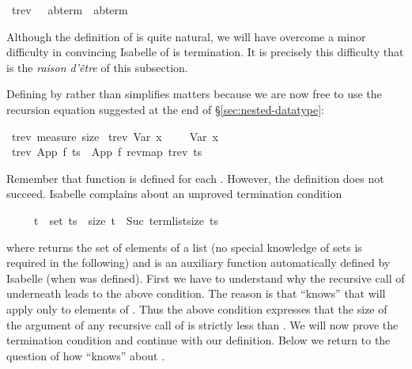 %
\begin{isabellebody}%
\ trev\ \ {\isacharcolon}{\isacharcolon}\ {\isachardoublequote}{\isacharparenleft}{\isacharprime}a{\isacharcomma}{\isacharprime}b{\isacharparenright}term\ {\isasymRightarrow}\ {\isacharparenleft}{\isacharprime}a{\isacharcomma}{\isacharprime}b{\isacharparenright}term{\isachardoublequote}%
\begin{isamarkuptext}%
\noindent
Although the definition of  is quite natural, we will have
overcome a minor difficulty in convincing Isabelle of is termination.
It is precisely this difficulty that is the \textit{raison d'\^etre} of
this subsection.

Defining  by  rather than 
simplifies matters because we are now free to use the recursion equation
suggested at the end of \S\ref{sec:nested-datatype}:%
\end{isamarkuptext}%
\ trev\ {\isachardoublequote}measure\ size{\isachardoublequote}\isanewline
\ {\isachardoublequote}trev\ {\isacharparenleft}Var\ x{\isacharparenright}\ \ \ \ {\isacharequal}\ Var\ x{\isachardoublequote}\isanewline
\ {\isachardoublequote}trev\ {\isacharparenleft}App\ f\ ts{\isacharparenright}\ {\isacharequal}\ App\ f\ {\isacharparenleft}rev{\isacharparenleft}map\ trev\ ts{\isacharparenright}{\isacharparenright}{\isachardoublequote}%
\begin{isamarkuptext}%
\noindent
Remember that function  is defined for each .
However, the definition does not succeed. Isabelle complains about an
unproved termination condition
%
\begin{isabelle}%
\ \ \ \ \ t\ {\isasymin}\ set\ ts\ {\isasymlongrightarrow}\ size\ t\ {\isacharless}\ Suc\ {\isacharparenleft}term{\isacharunderscore}list{\isacharunderscore}size\ ts{\isacharparenright}%
\end{isabelle}%

where  returns the set of elements of a list (no special
knowledge of sets is required in the following) and  is an auxiliary function automatically defined by Isabelle
(when  was defined).  First we have to understand why the
recursive call of  underneath  leads to the above
condition. The reason is that  ``knows'' that 
will apply  only to elements of . Thus the above
condition expresses that the size of the argument  of any
recursive call of  is strictly less than .  We will now prove the termination condition and
continue with our definition.  Below we return to the question of how
 ``knows'' about .%
\end{isamarkuptext}%
\end{isabellebody}%

